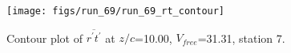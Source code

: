 \begin{figure}[H]
\centering
\texttt{[image: figs/run\_69/run\_69\_rt\_contour]}
\caption{Contour plot of $\overline{r^\prime t^\prime}$ at $z/c$=10.00, $V_{free}$=31.31, station 7.}
\end{figure}


